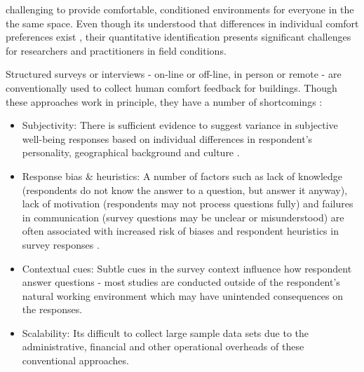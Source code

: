 

 challenging to provide comfortable, conditioned environments for everyone in the the same space. Even though its understood that differences in individual comfort preferences exist \cite{WANG2018181}, their quantitative identification presents significant challenges for researchers and practitioners in field conditions. 

Structured surveys or interviews - on-line or off-line, in person or remote - are conventionally used to collect human comfort feedback for buildings. Though these approaches work in principle, they have a number of shortcomings \cite{organisationforeconomicco-operationanddevelopment(oecd)_2013}:  

\begin{itemize}
  \item Subjectivity: There is sufficient evidence to suggest variance in subjective well-being responses based on individual differences in respondent's personality, geographical background and culture \cite{doi:10.1146/annurev.psych.54.101601.145056}.
  \item Response bias \& heuristics: A number of factors such as lack of knowledge (respondents do not know the answer to a question, but answer it anyway), lack of motivation (respondents may not process questions fully) and failures in communication (survey questions may be unclear or misunderstood) are often associated with increased risk of biases and respondent heuristics in survey responses \cite{bradburn2004asking}.
  \item Contextual cues: Subtle cues in the survey context influence how respondent answer questions \cite{krosnick1997seymour} - most studies are conducted outside of the respondent's natural working environment which may have unintended consequences on the responses. 
  \item Scalability: Its difficult to collect large sample data sets due to the administrative, financial and other operational overheads of these conventional approaches.
\end{itemize}


